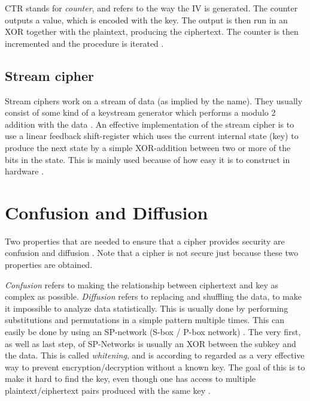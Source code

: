 CTR stands for \emph{counter}, and refers to the way the IV is generated. The
counter outputs a value, which is encoded with the key. The output is then run 
in an XOR together with the plaintext, producing the ciphertext. The counter is 
then incremented and the procedure is iterated \citep[p. 111]{Stinson:2006}.

\subsection{Stream cipher} \label{sec:StreamCipher}
Stream ciphers work on a stream of data (as implied by the name). They usually 
consist of some kind of a keystream generator which performs a modulo 2 addition
with the data \cite[pp. 67]{Simmons:1992}. An effective implementation of the 
stream cipher is to use a linear feedback shift-register which uses the current 
internal state (key) to produce the next state by a simple XOR-addition between 
two or more of the bits in the state. This is mainly used because of how easy
it is to construct in hardware \citep{LFSR:2008}.


\section{Confusion and Diffusion}\label{ch:ConfDiff}
Two properties that are needed to ensure that a cipher provides security are 
confusion and diffusion \citep{Shannon:1949}. Note that a cipher is not secure 
just because these two properties are obtained.

\emph{Confusion} refers to making the relationship between ciphertext and key as 
complex as possible. \emph{Diffusion} refers to replacing and shuffling the 
data, to make it impossible to analyze data statistically. This is usually done 
by performing substitutions and permutations in a simple pattern multiple times. 
This can easily be done by using an SP-network (S-box / P-box network) 
\citep[pp. 74--79]{Stinson:2006}. The very first, as well as last step, of 
SP-Networks is usually an XOR between the subkey and the data. This is called 
\emph{whitening}, and is according to \citet[p. 75]{Stinson:2006} regarded as a 
very effective way to prevent encryption/decryption without a known key. 
The goal of this is to make it hard to find the key, even though one has access 
to multiple plaintext/ciphertext pairs produced with the same key 
\citep{Shannon:1949}.

